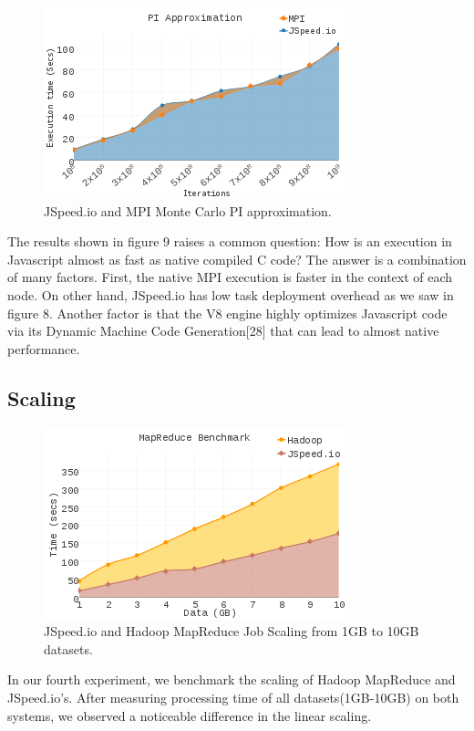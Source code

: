 \documentclass[10pt,reprint]{socc14}
\begin{document}
\begin{figure}	
	\centering
	\includegraphics[scale=3.0]{PI_Approximation} %
	\caption{JSpeed.io and MPI Monte Carlo PI approximation.}
\end{figure}

The results shown in figure 9 raises a common question: How is an execution in Javascript almost as fast as native compiled C code? The answer is a combination of many factors. First, the native MPI execution is faster in the context of each node. On other hand, JSpeed.io has low task deployment overhead as we saw in figure 8. Another factor is that the V8 engine highly optimizes Javascript code via its Dynamic Machine Code Generation[28] that can lead to almost native performance.


\subsection{Scaling}
\begin{figure}[h]	
	\centering
	\includegraphics[scale=3.0]{MapReduce_Benchmark}
	\caption{JSpeed.io and Hadoop MapReduce Job Scaling from 1GB to 10GB datasets.}
\end{figure}

In our fourth experiment, we benchmark the scaling of Hadoop MapReduce and JSpeed.io’s. After measuring processing time of all datasets(1GB-10GB) on both systems, we observed a noticeable difference in the linear scaling.
\end{document}
